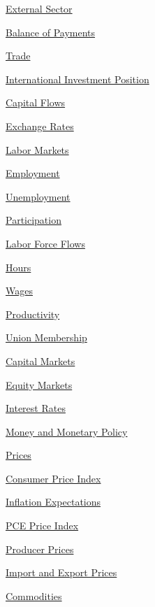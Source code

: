 \documentclass{report}
\begin{document}
\begin{minipage}{0.4\textwidth}
\begin{description}
\item {\hyperlink{ext}{External Sector}}
\begin{description}
\item {\hyperlink{exbop}{Balance of Payments}}
\item {\hyperlink{extt}{Trade}}
\item {\hyperlink{exiip}{International Investment Position}}
\item {\hyperlink{excf}{Capital Flows}}
\item {\hyperlink{extfx}{Exchange Rates}}
\end{description}
\item {\hyperlink{lab}{Labor Markets}}
\begin{description}
\item {\hyperlink{labe}{Employment}}
\item {\hyperlink{labu}{Unemployment}}
\item {\hyperlink{labp}{Participation}}
\item {\hyperlink{labf}{Labor Force Flows}}
\item {\hyperlink{labh}{Hours}}
\item {\hyperlink{labw}{Wages}}
\item {\hyperlink{labprod}{Productivity}}
\item {\hyperlink{labun}{Union Membership}}
\end{description}
\item {\hyperlink{cap}{Capital Markets}}
\begin{description}
\item {\hyperlink{capeq}{Equity Markets}}
\item {\hyperlink{capint}{Interest Rates}}
\item {\hyperlink{capmm}{Money and Monetary Policy}}
\end{description}
\item {\hyperlink{pr}{Prices}}
\begin{description}
\item {\hyperlink{prin}{Consumer Price Index}}
\item {\hyperlink{prie}{Inflation Expectations}}
\item {\hyperlink{prpce}{PCE Price Index}}
\item {\hyperlink{prp}{Producer Prices}}
\item {\hyperlink{prex}{Import and Export Prices}}
\item {\hyperlink{prco}{Commodities}}
\end{description}
\end{description}
\vspace{0.6cm}
\end{minipage}
\newpage
\end{document}
